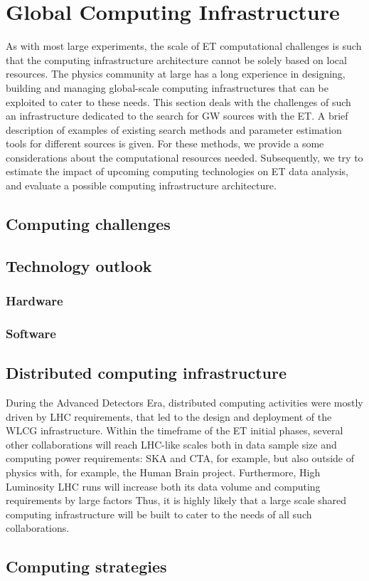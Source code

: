 \chapter{Global Computing Infrastructure}
\label{chap:GlobalComputingInfrastructure}
As with most large experiments, the scale of ET computational challenges is such that the computing infrastructure architecture cannot be solely based on local resources. The physics community at large has a long experience in designing, building and managing global-scale computing infrastructures that can be exploited to cater to these needs.  
This section deals with the challenges of such an infrastructure dedicated to the search for GW sources with the ET. 
A brief description of examples of existing search methods and parameter estimation tools for different sources is given. For these methods, we provide a some considerations about the computational resources needed. 
Subsequently, we try to estimate the impact of upcoming computing technologies on ET data analysis, and evaluate a possible computing infrastructure architecture.

\section[Computing challenges]{Computing challenges}
\label{sec:Computing challenges}
\section[Technology outlook]{Technology outlook}
\label{sec:Technology outlook}
\subsection{Hardware}
\subsection{Software}
\section[Distributed computing infrastructure]{Distributed computing infrastructure}
\label{sec:Distributed computing infrastructure}
During the Advanced Detectors Era, distributed computing activities were mostly driven by LHC requirements, that led to the design and deployment of the WLCG infrastructure.
Within the timeframe of the ET initial phases, several other collaborations will reach LHC-like scales both in data sample size and computing power requirements: SKA and CTA, for example, but also outside of physics with, for example, the Human Brain project. Furthermore, High Luminosity LHC runs will increase both its data volume and computing requirements by large factors
Thus, it is highly likely that a large scale shared computing infrastructure will be built to cater to the needs of all such collaborations. 
\section[Computing strategies]{Computing strategies}
\label{sec:Computing strategies}
